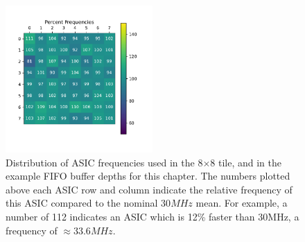 \begin{figure}[]
\centering
\includegraphics[width=0.5\textwidth]{images/asic_frequency.pdf}
\caption{Distribution of ASIC frequencies used in the 8$\times$8 tile, and in the example FIFO buffer depths for this chapter.
The numbers plotted above each ASIC row and column indicate the relative frequency of this ASIC compared to the nominal 30$\unit{MHz}$ mean.
For example, a number of 112 indicates an ASIC which is 12\% faster than 30MHz, a frequency of $\approx 33.6 MHz$.}
\end{figure}~\label{fig:asic_frequency_example}



